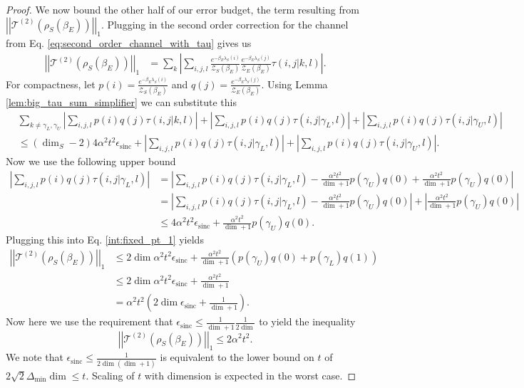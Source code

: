 \documentclass{article}
\newcommand{\parens}[1]{\left( #1 \right)}
\newcommand{\abs}[1]{\left| #1 \right|}
\newcommand{\norm}[1]{\left| \left| #1 \right| \right|}
\newcommand{\partfun}{\mathcal{Z}}
\DeclareMathOperator{\sinc}{sinc}
\begin{document}
\begin{proof}
    We now bound the other half of our error budget, the term resulting from $\norm{\mathcal{T}^{(2)}(\rho_S(\beta_E))}_1$. Plugging in the second order correction for the channel from Eq. \eqref{eq:second_order_channel_with_tau} gives us
    \begin{align}
        \norm{\mathcal{T}^{(2)}(\rho_S(\beta_E))}_1 &= \sum_k \abs{\sum_{i,j,l} \frac{e^{-\beta_E \lambda_S(i)}}{\partfun_S(\beta_E)} \frac{e^{-\beta_E \lambda_S(j)}}{\partfun_E(\beta_E)} \tau(i,j|k,l)}.
    \end{align}
    For compactness, let $p(i) = \frac{e^{-\beta_E \lambda_S(i)}}{\partfun_S(\beta_E)}$ and $q(j) =\frac{e^{-\beta_E \lambda_S(j)}}{\partfun_E(\beta_E)}$. Using Lemma \ref{lem:big_tau_sum_simplifier} we can substitute this 
    \begin{align}
        &\sum_{k \neq \gamma_L, \gamma_U} \abs{\sum_{i,j,l} p(i) q(j) \tau(i,j|k,l) } + \abs{\sum_{i,j,l} p(i)q(j) \tau(i,j | \gamma_L, l)} + \abs{\sum_{i,j,l} p(i) q(j) \tau(i,j| \gamma_U, l)} \\
        &\leq (\dim_S - 2) 4 \alpha^2 t^2 \epsilon_{\sinc} + \abs{\sum_{i,j,l} p(i)q(j) \tau(i,j | \gamma_L, l)} + \abs{\sum_{i,j,l} p(i) q(j) \tau(i,j| \gamma_U, l)}. \label{int:fixed_pt_1}
    \end{align}
    Now we use the following upper bound
    \begin{align}
        \abs{\sum_{i,j,l} p(i) q(j) \tau(i,j|\gamma_L ,l)} &= \abs{\sum_{i,j,l} p(i) q(j) \tau(i,j|\gamma_L ,l) - \frac{\alpha^2 t^2}{\dim + 1} p(\gamma_U) q(0) + \frac{\alpha^2 t^2}{\dim + 1} p(\gamma_U) q(0)} \\
        &= \abs{\sum_{i,j,l} p(i) q(j) \tau(i,j|\gamma_L ,l) - \frac{\alpha^2 t^2}{\dim + 1} p(\gamma_U) q(0)} + \abs{\frac{\alpha^2 t^2}{\dim + 1} p(\gamma_U) q(0)} \\
        &\leq 4 \alpha^2 t^2 \epsilon_{\sinc} + \frac{\alpha^2 t^2}{\dim + 1} p(\gamma_U) q(0).
    \end{align}
    Plugging this into Eq. \eqref{int:fixed_pt_1} yields
    \begin{align}
        \norm{\mathcal{T}^{(2)} (\rho_S(\beta_E))}_1 &\leq 2 \dim \alpha^2 t^2 \epsilon_{\sinc} + \frac{\alpha^2 t^2}{\dim + 1}(p(\gamma_U) q(0) + p(\gamma_L) q(1)) \\
        &\leq 2 \dim \alpha^2 t^2 \epsilon_{\sinc} + \frac{\alpha^2 t^2}{\dim + 1} \\
        &= \alpha^2 t^2 \parens{2 \dim \epsilon_{\sinc} + \frac{1}{\dim + 1}}.
    \end{align}
    Now here we use the requirement that $\epsilon_{\sinc} \leq \frac{1}{\dim + 1} \frac{1}{2 \dim}$ to yield the inequality
    \begin{equation}
        \norm{\mathcal{T}^{(2)}(\rho_S(\beta_E))}_1 \leq 2 \alpha^2 t^2. \label{eq:upper_bound_on_T_2}
    \end{equation}
    We note that $\epsilon_{\sinc} \leq \frac{1}{2 \dim (\dim + 1)}$ is equivalent to the lower bound on $t$ of $2 \sqrt{2} \Delta_{\min} \dim \leq t$. Scaling of $t$ with dimension is expected in the worst case. 


\end{proof}
\end{document}
